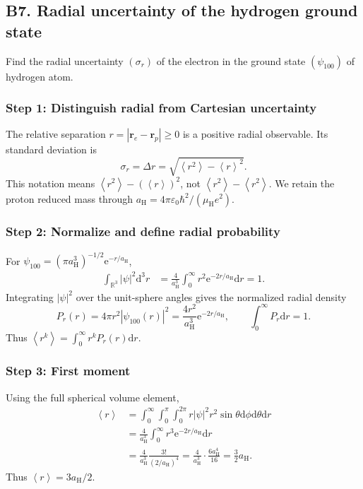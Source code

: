 \documentclass[11pt,a4paper]{article}
\newcommand{\dd}{\mathrm{d}}
\newcommand{\ee}{\mathrm{e}}
\newcommand{\avg}[1]{\left\langle #1\right\rangle}
\newcommand{\R}{\mathbb R}
\newcommand{\aH}{a_{\mathrm H}}
\newcommand{\mH}{\mu_{\mathrm H}}
\newcommand{\eps}{\varepsilon_0}
\begin{document}
\subsection{B7. Radial uncertainty of the hydrogen ground state}
\begin{questionbox}Find the radial uncertainty \((\sigma_r)\) of the electron in the ground state \((\psi_{100})\) of hydrogen atom.\end{questionbox}
\subsubsection*{Step 1: Distinguish radial from Cartesian uncertainty}
The relative separation \(r=|\mathbf r_e-\mathbf r_p|\ge0\) is a positive radial observable. Its standard deviation is
\begin{equation}\boxed{\sigma_r=\Delta r=\sqrt{\avg{r^2}-\avg r^2}.}\end{equation}
This notation means \(\avg{r^2}-(\avg r)^2\), not \(\avg{r^2}-\avg{r^2}\). We retain the proton reduced mass through \(\aH=4\pi\eps\hbar^2/(\mH e^2)\).

\subsubsection*{Step 2: Normalize and define radial probability}
For \(\psi_{100}=(\pi\aH^3)^{-1/2}\ee^{-r/\aH}\),
\begin{align}
\int_{\R^3}|\psi|^2\dd^3r&=\frac4{\aH^3}\int_0^\infty r^2\ee^{-2r/\aH}\dd r=1.
\end{align}
Integrating \(|\psi|^2\) over the unit-sphere angles gives the normalized radial density
\begin{equation}\boxed{P_r(r)=4\pi r^2|\psi_{100}(r)|^2=\frac{4r^2}{\aH^3}\ee^{-2r/\aH},\qquad \int_0^\infty P_r\dd r=1.}\end{equation}
Thus \(\avg{r^k}=\int_0^\infty r^kP_r(r)\dd r\).

\subsubsection*{Step 3: First moment}
Using the full spherical volume element,
\begin{align}
\avg r&=\int_0^\infty\!\int_0^\pi\!\int_0^{2\pi}r|\psi|^2r^2\sin\theta\dd\phi\dd\theta\dd r\\
&=\frac4{\aH^3}\int_0^\infty r^3\ee^{-2r/\aH}\dd r\\
&=\frac4{\aH^3}\frac{3!}{(2/\aH)^4}=\frac4{\aH^3}\cdot\frac{6\aH^4}{16}=\frac32\aH.
\end{align}
Thus \(\boxed{\avg r=3\aH/2}\).
\end{document}
